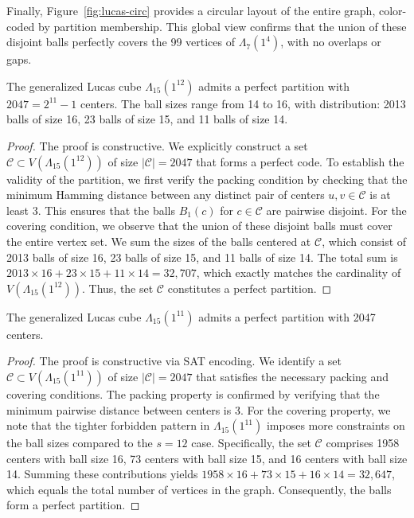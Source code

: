 Finally, Figure~\ref{fig:lucas-circ} provides a circular layout of the entire graph, color-coded by partition membership. This global view confirms that the union of these disjoint balls perfectly covers the 99 vertices of $\Lambda_7(1^4)$, with no overlaps or gaps.


\begin{theorem}\label{thm:lambda1512}
The generalized Lucas cube $\Lambda_{15}(1^{12})$ admits a perfect partition with $2047 = 2^{11} - 1$ centers. The ball sizes range from 14 to 16, with distribution: 2013 balls of size 16, 23 balls of size 15, and 11 balls of size 14.
\end{theorem}

\begin{proof}
The proof is constructive. We explicitly construct a set $\mathcal{C} \subset V(\Lambda_{15}(1^{12}))$ of size $|\mathcal{C} | = 2047$ that forms a perfect code. To establish the validity of the partition, we first verify the packing condition by checking that the minimum Hamming distance between any distinct pair of centers $u, v \in \mathcal{C}$ is at least 3. This ensures that the balls $B_1(c)$ for $c \in \mathcal{C}$ are pairwise disjoint. For the covering condition, we observe that the union of these disjoint balls must cover the entire vertex set. We sum the sizes of the balls centered at $\mathcal{C}$, which consist of 2013 balls of size 16, 23 balls of size 15, and 11 balls of size 14. The total sum is $2013 \times 16 + 23 \times 15 + 11 \times 14 = 32{,}707$, which exactly matches the cardinality of $V(\Lambda_{15}(1^{12}))$. Thus, the set $\mathcal{C}$ constitutes a perfect partition.
\end{proof}

\begin{theorem}\label{thm:lambda1511}
The generalized Lucas cube $\Lambda_{15}(1^{11})$ admits a perfect partition with 2047 centers.
\end{theorem}

\begin{proof}
The proof is constructive via SAT encoding. We identify a set $\mathcal{C} \subset V(\Lambda_{15}(1^{11}))$ of size $|\mathcal{C}| = 2047$ that satisfies the necessary packing and covering conditions. The packing property is confirmed by verifying that the minimum pairwise distance between centers is 3. For the covering property, we note that the tighter forbidden pattern in $\Lambda_{15}(1^{11})$ imposes more constraints on the ball sizes compared to the $s=12$ case. Specifically, the set $\mathcal{C}$ comprises 1958 centers with ball size 16, 73 centers with ball size 15, and 16 centers with ball size 14. Summing these contributions yields $1958 \times 16 + 73 \times 15 + 16 \times 14 = 32{,}647$, which equals the total number of vertices in the graph. Consequently, the balls form a perfect partition.
\end{proof}

